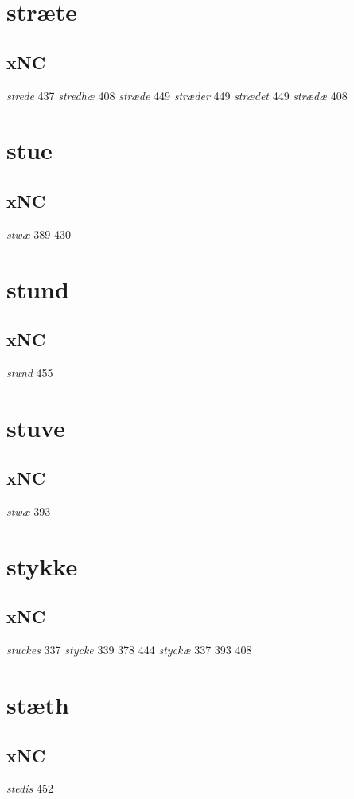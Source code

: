 \documentclass[a4paper,twocolumn]{article}
\begin{document}
\section{stræte}
\label{sec:org3100e77}
\subsection{xNC}
\label{sec:org912cdf7}
\emph{strede} 437 \emph{stredhæ} 408 \emph{stræde} 449 \emph{stræder} 449 \emph{strædet} 449 \emph{strædæ} 408 
\section{stue}
\label{sec:orgb180f31}
\subsection{xNC}
\label{sec:org62751e8}
\emph{stwæ} 389 430 
\section{stund}
\label{sec:org8b632de}
\subsection{xNC}
\label{sec:orgf424bab}
\emph{stund} 455 
\section{stuve}
\label{sec:org67dd2e0}
\subsection{xNC}
\label{sec:org27a2f94}
\emph{stwæ} 393 
\section{stykke}
\label{sec:orgac0fc2a}
\subsection{xNC}
\label{sec:org830ea97}
\emph{stuckes} 337 \emph{stycke} 339 378 444 \emph{styckæ} 337 393 408 
\section{stæth}
\label{sec:org656bd92}
\subsection{xNC}
\label{sec:org440efae}
\emph{stedis} 452 
\end{document}
